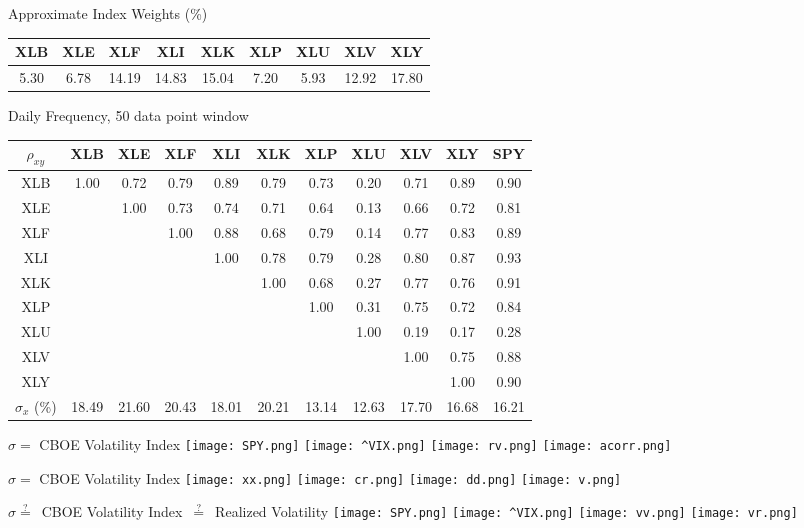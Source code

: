 \documentclass[6pt]{article}
\begin{document}
\begin{center}
Approximate Index Weights (\%) \\
\begin{tabular}{|ccccccccc|}
  \hline
  XLB & XLE & XLF & XLI & XLK & XLP & XLU & XLV & XLY \\
  \hline
  5.30 & 6.78 & 14.19 & 14.83 & 15.04 & 7.20 & 5.93 & 12.92 & 17.80 \\
  \hline
\end{tabular} 
\vspace{0.25in}

Daily Frequency, 50 data point window \\
\begin{tabular}{|c|ccccccccc||c|}
  \hline
  $\rho_{xy}$ & XLB & XLE & XLF & XLI & XLK & XLP & XLU & XLV & XLY & SPY \\
  \hline
    XLB & 1.00 & 0.72 & 0.79 & 0.89 & 0.79 & 0.73 & 0.20 & 0.71 & 0.89 & 0.90 \\
    XLE & & 1.00 & 0.73 & 0.74 & 0.71 & 0.64 & 0.13 & 0.66 & 0.72 & 0.81 \\
    XLF & & & 1.00 & 0.88 & 0.68 & 0.79 & 0.14 & 0.77 & 0.83 & 0.89 \\
    XLI & & & & 1.00 & 0.78 & 0.79 & 0.28 & 0.80 & 0.87 & 0.93 \\
    XLK & & & & & 1.00 & 0.68 & 0.27 & 0.77 & 0.76 & 0.91 \\
    XLP & & & & & & 1.00 & 0.31 & 0.75 & 0.72 & 0.84 \\
    XLU & & & & & & & 1.00 & 0.19 & 0.17 & 0.28 \\
    XLV & & & & & & & & 1.00 & 0.75 & 0.88 \\
    XLY & & & & & & & & & 1.00 & 0.90 \\
  \hline
  \hline
  $\sigma_{x}$ (\%) & 18.49 & 21.60 & 20.43 & 18.01 & 20.21 & 13.14 & 12.63 & 17.70 & 16.68 & 16.21 \\
  \hline
\end{tabular}

\newpage

\Large{$\sigma=$ CBOE Volatility Index}
\texttt{[image: SPY.png]}
\texttt{[image: ^VIX.png]}
\texttt{[image: rv.png]}
\texttt{[image: acorr.png]}

\newpage

\Large{$\sigma=$ CBOE Volatility Index}
\texttt{[image: xx.png]}
\texttt{[image: cr.png]}
\texttt{[image: dd.png]}
\texttt{[image: v.png]}

\newpage

\Large{$\sigma\overset{?}{=}$\ CBOE Volatility Index\ $\overset{?}{=}$\ Realized Volatility}
\texttt{[image: SPY.png]}
\texttt{[image: ^VIX.png]}
\texttt{[image: vv.png]}
\texttt{[image: vr.png]}


\end{center}
\end{document}
